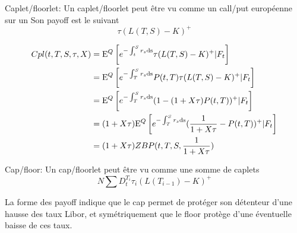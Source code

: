 \begin{defn}
  Caplet/floorlet:
  Un caplet/floorlet peut être vu comme un call/put européenne sur un
  Son payoff est le suivant
$$ \tau (L(T, S) - K)^+ $$
\end{defn}

\begin{align}
  Cpl(t, T, S, \tau, X)
  &= \mathrm{E}^Q \left[  e^{-\int_t^S r_s \rm{d}s} \tau (L(T, S) - K)^+ | F_t \right] \\ 
  &= \mathrm{E}^Q \left[  e^{-\int_T^S r_s \rm{d}s} P(t, T)  \tau (L(T, S) - K)^+ | F_t \right] \\
  &= \mathrm{E}^Q \left[  e^{-\int_T^S r_s \rm{d}s} (1 - (1 + X \tau)P(t, T))^+ | F_t \right] \\
  &= (1 + X \tau) \mathrm{E}^Q \left[  e^{-\int_T^S r_s \rm{d}s} (\frac{1}{1 + X \tau} - P(t, T))^+ | F_t \right] \\
  &= (1+X \tau) ZBP(t, T, S, \frac{1}{1+X \tau})
\end{align}

\begin{defn}
  Cap/floor:
Un cap/floorlet peut être vu comme une somme de caplets
$$ N \sum D_t^{T_i} \tau_i (L(T_{i-1}) - K)^+ $$
\end{defn}

La forme des payoff indique que le cap permet de protéger son détenteur d’une hausse des taux Libor, et symétriquement que le floor protège d’une éventuelle baisse de ces taux.


